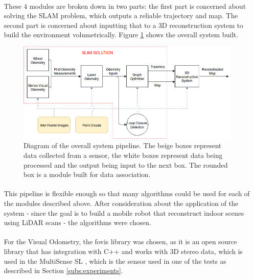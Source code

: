 \documentclass[12pt]{article}
\begin{document}
	\paragraph{}
	These 4 modules are broken down in two parts: the first part is concerned about solving the SLAM problem, which outputs a reliable trajectory and map. The second part is concerned about inputting that to a 3D reconstruction system to build the environment volumetrically. Figure \ref{fig:SystemPipelineFigure1} shows the overall system built.
	\begin{figure}[h]
		\includegraphics[width=\linewidth]{SystemPipeline}
		\caption{Diagram of the overall system pipeline. The beige boxes represent data collected from a sensor, the white boxes represent data being processed and the output being input to the next box. The rounded box is a module built for data association.}
		\label{fig:SystemPipelineFigure1}
	\end{figure}
	
	\paragraph{}
	This pipeline is flexible enough so that many algorithms could be used for each of the modules described above. After consideration about the application of the system - since the goal is to build a mobile robot that reconstruct indoor scenes using LiDAR scans - the algorithms were chosen.
	
	\paragraph{}
	For the Visual Odometry, the fovis library \cite{fovis} was chosen, as it is an open source library that has integration with C++ and works with 3D stereo data, which is used in the MultiSense SL \cite{multisense}, which is the sensor used in one of the tests as described in Section \ref{subs:experiments}.
	
\end{document}
